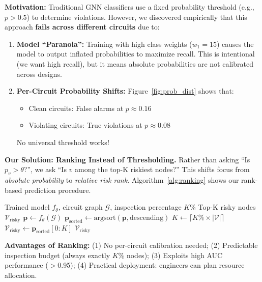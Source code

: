 \textbf{Motivation:}
Traditional GNN classifiers use a fixed probability threshold (e.g., $p > 0.5$) to determine violations. However, we discovered empirically that this approach \textbf{fails across different circuits} due to:
\begin{enumerate}
    \item \textbf{Model ``Paranoia'':} Training with high class weights ($w_1 = 15$) causes the model to output inflated probabilities to maximize recall. This is intentional (we want high recall), but it means absolute probabilities are not calibrated across designs.
    
    \item \textbf{Per-Circuit Probability Shifts:} Figure~\ref{fig:prob_dist} shows that:
    \begin{itemize}
        \item Clean circuits: False alarms at $p \approx 0.16$
        \item Violating circuits: True violations at $p \approx 0.08$
    \end{itemize}
    No universal threshold works!
\end{enumerate}

\textbf{Our Solution: Ranking Instead of Thresholding.}
Rather than asking ``Is $p_v > \theta$?'', we ask ``Is $v$ among the top-K riskiest nodes?'' This shifts focus from \textit{absolute probability} to \textit{relative risk rank}. Algorithm~\ref{alg:ranking} shows our rank-based prediction procedure.

\begin{algorithm}[t]
\caption{Rank-Based Timing Violation Prediction}
\label{alg:ranking}
\begin{algorithmic}[1]
\REQUIRE Trained model $f_\theta$, circuit graph $\mathcal{G}$, inspection percentage $K\%$
\ENSURE Top-K risky nodes $\mathcal{V}_{\text{risky}}$
\STATE $\mathbf{p} \leftarrow f_\theta(\mathcal{G})$ 
\STATE $\mathbf{p}_{\text{sorted}} \leftarrow \text{argsort}(\mathbf{p}, \text{descending})$ 
\STATE $K \leftarrow \lceil K\% \times |\mathcal{V}| \rceil$
\STATE $\mathcal{V}_{\text{risky}} \leftarrow \mathbf{p}_{\text{sorted}}[0:K]$
\RETURN $\mathcal{V}_{\text{risky}}$
\end{algorithmic}
\end{algorithm}

\textbf{Advantages of Ranking:}
(1) No per-circuit calibration needed;
(2) Predictable inspection budget (always exactly $K$\% nodes);
(3) Exploits high AUC performance ($>$0.95);
(4) Practical deployment: engineers can plan resource allocation.

